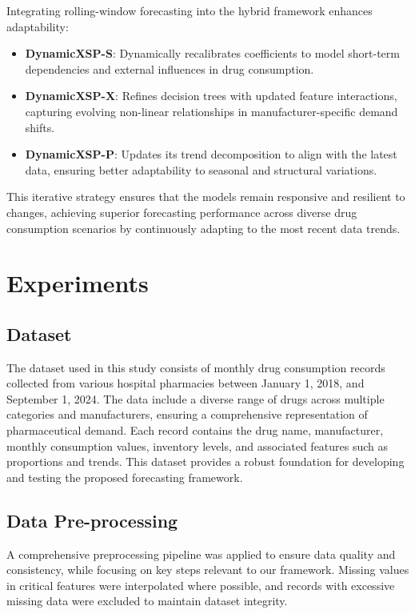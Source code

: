\documentclass[journal]{IEEEtran}
\begin{document}
Integrating rolling-window forecasting into the hybrid framework enhances adaptability:
\begin{itemize}
    \item \textbf{DynamicXSP-S}: Dynamically recalibrates coefficients to model short-term dependencies and external influences in drug consumption.
    \item \textbf{DynamicXSP-X}: Refines decision trees with updated feature interactions, capturing evolving non-linear relationships in manufacturer-specific demand shifts.
    \item \textbf{DynamicXSP-P}: Updates its trend decomposition to align with the latest data, ensuring better adaptability to seasonal and structural variations.
\end{itemize}

This iterative strategy ensures that the models remain responsive and resilient to changes, achieving superior forecasting performance across diverse drug consumption scenarios by continuously adapting to the most recent data trends.

\section{Experiments}

\subsection{Dataset}
The dataset used in this study consists of monthly drug consumption records collected from various hospital pharmacies between January 1, 2018, and September 1, 2024. The data include a diverse range of drugs across multiple categories and manufacturers, ensuring a comprehensive representation of pharmaceutical demand. Each record contains the drug name, manufacturer, monthly consumption values, inventory levels, and associated features such as proportions and trends. This dataset provides a robust foundation for developing and testing the proposed forecasting framework.

\subsection{Data Pre-processing}
A comprehensive preprocessing pipeline was applied to ensure data quality and consistency, while focusing on key steps relevant to our framework. Missing values in critical features were interpolated where possible, and records with excessive missing data were excluded to maintain dataset integrity.
\end{document}
